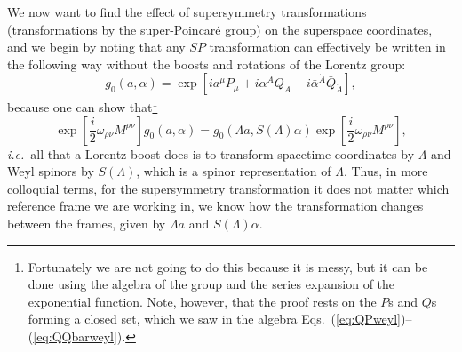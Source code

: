 \documentclass[notes.tex]{subfiles}
\begin{document}
We now want to find the effect of supersymmetry transformations (transformations by the super-Poincaré group) on the superspace coordinates, and we begin by noting that any $SP$ transformation can effectively be written in the following way without the boosts and rotations of the Lorentz group:
\[g_0(a,\alpha) = \exp[ia^\mu P_\mu + i\alpha^AQ_A +i\bar{\alpha}^{\dot{A}}\bar{Q}_{\dot{A}}],\]
because one can show that\footnote{Fortunately we are not going to do this because it is messy, but it can be done using the algebra of the group and the series expansion of the exponential function. Note, however, that the proof rests on the $P$s and $Q$s forming a closed set, which we saw in the algebra Eqs.~(\ref{eq:QPweyl})--(\ref{eq:QQbarweyl}).}
\begin{equation}
\exp\left[\frac{i}{2}\omega_{\rho\nu}M^{\rho\nu}\right]g_0(a,\alpha) = g_0(\Lambda a,S(\Lambda)\alpha)\exp\left[\frac{i}{2}\omega_{\rho\nu}M^{\rho\nu}\right],
\end{equation}
{\it i.e.}\ all that a Lorentz boost does is to transform spacetime coordinates by $\Lambda$ and Weyl spinors by $S(\Lambda)$, which is a spinor representation of $\Lambda$. Thus, in more colloquial terms, for the supersymmetry transformation it does not matter which reference frame we are working in, we know how the transformation changes between the frames, given by  $\Lambda a$  and $S(\Lambda)\alpha$. 
\end{document}
